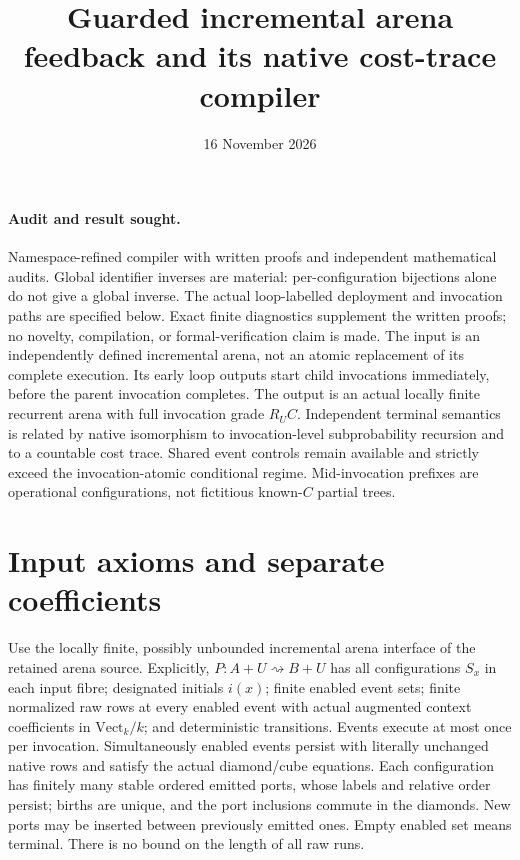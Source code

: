 \documentclass[11pt]{article}
\title{Guarded incremental arena feedback and its native cost-trace compiler}
\date{16 November 2026}
\begin{document}
\maketitle
\paragraph{Audit and result sought.} Namespace-refined compiler with written proofs and independent mathematical audits. Global identifier inverses are material: per-configuration bijections alone do not give a global inverse. The actual loop-labelled deployment and invocation paths are specified below. Exact finite diagnostics supplement the written proofs; no novelty, compilation, or formal-verification claim is made. The input is an independently defined incremental arena, not an atomic replacement of its complete execution. Its early loop outputs start child invocations immediately, before the parent invocation completes. The output is an actual locally finite recurrent arena with full invocation grade $R_UC$. Independent terminal semantics is related by native isomorphism to invocation-level subprobability recursion and to a countable cost trace. Shared event controls remain available and strictly exceed the invocation-atomic conditional regime. Mid-invocation prefixes are operational configurations, not fictitious known-$C$ partial trees.

\section{Input axioms and separate coefficients}
Use the locally finite, possibly unbounded incremental arena interface of the retained arena source. Explicitly, $P:A+U\rightsquigarrow B+U$ has all configurations $S_x$ in each input fibre; designated initials $i(x)$; finite enabled event sets; finite normalized raw rows at every enabled event with actual augmented context coefficients in $\mathrm{Vect}_k/k$; and deterministic transitions. Events execute at most once per invocation. Simultaneously enabled events persist with literally unchanged native rows and satisfy the actual diamond/cube equations. Each configuration has finitely many stable ordered emitted ports, whose labels and relative order persist; births are unique, and the port inclusions commute in the diamonds. New ports may be inserted between previously emitted ones. Empty enabled set means terminal. There is no bound on the length of all raw runs.
\end{document}
